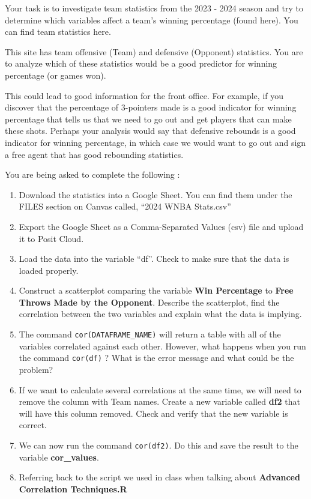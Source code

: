 \documentclass[
  letterpaper,
  DIV=11,
  numbers=noendperiod]{scrreprt}
\begin{document}
Your task is to investigate team statistics from the 2023 - 2024 season
and try to determine which variables affect a team's winning percentage
(found here). You can find team statistics here.

This site has team offensive (Team) and defensive (Opponent) statistics.
You are to analyze which of these statistics would be a good predictor
for winning percentage (or games won).

This could lead to good information for the front office. For example,
if you discover that the percentage of 3-pointers made is a good
indicator for winning percentage that tells us that we need to go out
and get players that can make these shots. Perhaps your analysis would
say that defensive rebounds is a good indicator for winning percentage,
in which case we would want to go out and sign a free agent that has
good rebounding statistics.

You are being asked to complete the following :

\begin{enumerate}
\def\labelenumi{\arabic{enumi}.}
\item
  Download the statistics into a Google Sheet. You can find them under
  the FILES section on Canvas called, ``2024 WNBA Stats.csv''
\item
  Export the Google Sheet as a Comma-Separated Values (csv) file and
  upload it to Posit Cloud.
\item
  Load the data into the variable ``df''. Check to make sure that the
  data is loaded properly.
\item
  Construct a scatterplot comparing the variable \textbf{Win Percentage}
  to \textbf{Free Throws Made by the Opponent}. Describe the
  scatterplot, find the correlation between the two variables and
  explain what the data is implying.
\item
  The command \texttt{cor(DATAFRAME\_NAME)} will return a table with all
  of the variables correlated against each other. However, what happens
  when you run the command \texttt{cor(df)} ? What is the error message
  and what could be the problem?
\item
  If we want to calculate several correlations at the same time, we will
  need to remove the column with Team names. Create a new variable
  called \textbf{df2} that will have this column removed. Check and
  verify that the new variable is correct.
\item
  We can now run the command \texttt{cor(df2)}. Do this and save the
  result to the variable \textbf{cor\_values}.
\item
  Referring back to the script we used in class when talking about
  \textbf{Advanced Correlation Techniques.R}
\end{enumerate}
\end{document}

